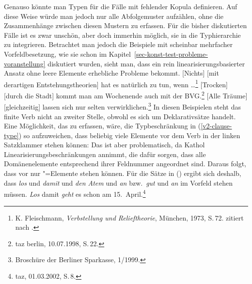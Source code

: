 Genauso könnte man Typen für die Fälle mit fehlender Kopula definieren. Auf diese Weise würde
man jedoch nur alle Abfolgemuster aufzählen, ohne die Zusammenhänge zwischen diesen Mustern
zu erfassen. Für die bisher diskutierten Fälle ist es zwar unschön, aber doch immerhin
möglich, sie in die Typhierarchie zu integrieren. Betrachtet man jedoch die Beispiele mit scheinbar
mehrfacher Vorfeldbesetzung, wie sie schon im Kapitel~\ref{sec-konst-test-probleme-voranstellung}
diskutiert wurden, sieht man, dass ein rein linearisierungsbasierter Ansatz ohne leere Elemente
erhebliche Probleme bekommt.
\eal
\ex {}[Nichts] [mit  derartigen     Entstehungstheorien] hat es natürlich zu tun, wenn \ldots\footnote{
        K. Fleischmann, \emph{Verbstellung und Relieftheorie}, München, 1973, S.\,72.
        zitiert nach .}
\label{bsp-nichts-mit-derartigen-udc}
\ex {}[Trocken] [durch   die Stadt] kommt man am     Wochenende auch mit  der BVG.\footnote{
        taz berlin, 10.07.1998, S.\,22.
      }\label{bsp-trocken-durch-die-stadt-udc}
\ex\label{bsp-alle-traeume-udc}
    {}[Alle Träume] [gleichzeitig]  lassen sich nur  selten verwirklichen.\footnote{
        Broschüre der Berliner Sparkasse, 1/1999.
        }
\zl
In diesen Beispielen steht das finite Verb nicht an zweiter Stelle, obwohl es sich um Deklarativsätze
handelt. Eine Möglichkeit, das zu erfassen, wäre, die Typbeschränkung in (\ref{v2-clause-type}) so aufzuweichen,
dass beliebig viele Elemente vor dem Verb in der linken Satzklammer stehen können:
\ea
  \impl {}
\z
Das ist aber problematisch, da Kathol Linearisierungsbeschränkungen annimmt, die dafür sorgen,
dass alle Domänenelemente entsprechend ihrer Feldnummer angeordnet sind. Daraus folgt, dass
vor  nur "=Elemente stehen können. Für die Sätze in () ergibt sich
deshalb, dass \emph{los} und \emph{damit} und \emph{den Atem} und \emph{an} bzw.\ \emph{gut}
und \emph{an} im Vorfeld stehen müssen.
\eal
\label{bsp-particle-vf-udc}
\ex\label{bsp-los-damit-udc} 
\emph{Los} damit \emph{geht} es schon am 15.\ April.\footnote{
        taz, 01.03.2002, S.\,8.%
    }
